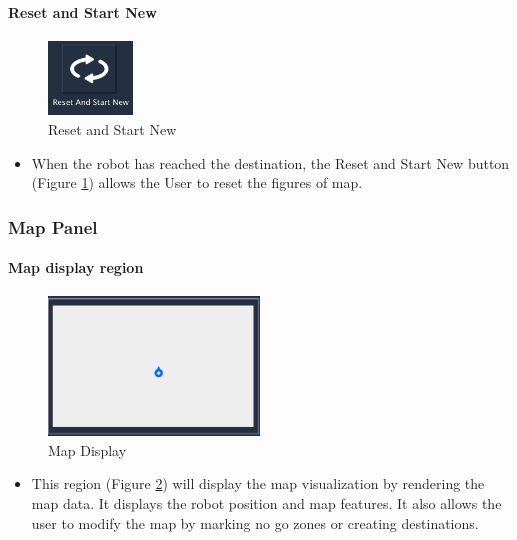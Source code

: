 \documentclass[12pt,a4paper]{article}
\begin{document}
\paragraph{Reset and Start New}\label{RESET}
\begin{figure}[!htb]
\centering
\includegraphics[width=0.2\textwidth]{Reset}
\caption{Reset and Start New}
\label{reset}
\end{figure}
\begin{itemize} 
\item When the robot has reached the destination, the Reset and Start New button (Figure \ref{reset}) allows the User to reset the figures of map.
\end{itemize}

\subsubsection{Map Panel} 
\paragraph{Map display region}\label{MAPDISPLAY}
\begin{figure}[!htb]
\centering
\includegraphics[width=0.5\textwidth]{MapDisplay}
\caption{Map Display}
\label{map display}
\end{figure}
\begin{itemize} 
\item This region (Figure \ref{map display}) will display the map visualization by rendering the map data. It displays the robot position and map features. It also allows the user to modify the map by marking no go zones or creating destinations.
\end{itemize}
\end{document}
